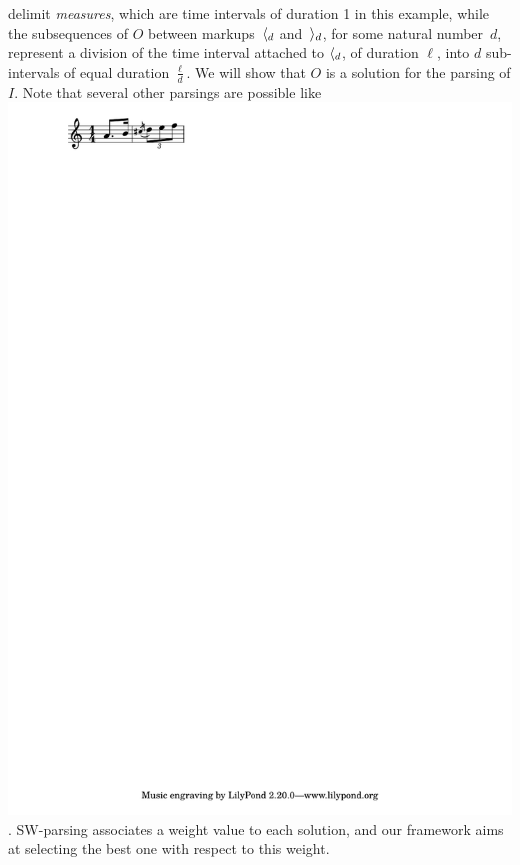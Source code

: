 \begin{example}
delimit \emph{measures},
which are time intervals of duration 1 in this example,
while the subsequences of $O$ between markups~$\langle_{d}$ and~$\rangle_{d}$,
for some natural number~$d$,
represent a division of the time interval attached to $\langle_{d}$,
of duration $\ell$,
into $d$ sub-intervals of equal duration $\frac{\ell}{d}$.
%
We will show that $O$ is a solution for the
parsing of $I$. Note that several other parsings are possible
like \eg \includegraphics[scale=0.35,trim=0 5mm 0 0]{pictures/ex2.pdf}.
SW-parsing associates a weight value
to each solution, and our framework
aims at selecting the best one with respect to this weight.
\endex
\end{example}
